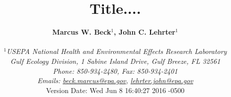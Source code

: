\documentclass[letterpaper,12pt,oneside]{article}\usepackage[]{graphicx}\usepackage[]{color}
\begin{document}
\raggedbottom
\linenumbers
\raggedright
{}
\setlength{\parindent}{0.5in}
\renewcommand\refname{References \vspace{12pt}}

\begin{singlespace}
\title{{\bf {\Large Title....}}}
\author{
  {\bf {\normalsize Marcus W. Beck$^1$, John C. Lehrter$^1$}}
  \\\\{\textit {\normalsize $^1$USEPA National Health and Environmental Effects Research Laboratory}}
  \\{\textit {\normalsize Gulf Ecology Division, 1 Sabine Island Drive, Gulf Breeze, FL 32561}}
	\\{\textit {\normalsize Phone: 850-934-2480, Fax: 850-934-2401}}
	\\{\textit {\normalsize Emails: \href{mailto:beck.marcus@epa.gov}{beck.marcus@epa.gov}, \href{mailto:lehrter.john@epa.gov}{lehrter.john@epa.gov}}}
  \vspace{1in} 
  \\ Version Date:   Wed Jun 8 16:40:27 2016 -0500
	}
\date{}
\maketitle
\end{singlespace}
\clearpage
\end{document}
